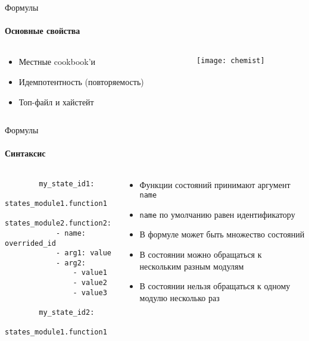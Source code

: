 \begin{Frame}{Формулы}

  \framesubtitle{Основные свойства}

  \begin{columns}
    \begin{column}{0.6\textwidth}
      \begin{itemize}[<+-| alert@ +>]
        \item[\faBook] Местные cookbook'и
        \baselinespace{}
        \item[\faRedo] Идемпотентность (повторяемость)
        \baselinespace{}
        \item[\faRocket] Топ-файл и хайстейт \ExampleIcon{}
      \end{itemize}
    \end{column}

    \begin{column}{0.4\textwidth}
      \texttt{[image: chemist]}
    \end{column}
  \end{columns}

\end{Frame}

\begin{frame}[fragile]{Формулы}
  \framesubtitle{Синтаксис}

  \begin{columns}
    \begin{column}{0.25\textwidth}
      \begin{verbatim}
        my_state_id1:
          states_module1.function1
          states_module2.function2:
            - name: overrided_id
            - arg1: value
            - arg2:
                - value1
                - value2
                - value3

        my_state_id2:
          states_module1.function1
      \end{verbatim}
    \end{column}
    \begin{column}{0.65\textwidth}
      \onslide<+->
      \begin{itemize}[<+-| alert@ +>]
        \footnotesize
        \item Функции состояний принимают аргумент \texttt{name}
        \baselinespace{}
        \item \texttt{name} по умолчанию равен идентификатору
        \baselinespace{}
        \item В формуле может быть множество состояний
        \baselinespace{}
        \item В состоянии можно обращаться к нескольким разным модулям
        \baselinespace{}
        \item В состоянии нельзя обращаться к одному модулю несколько раз
      \end{itemize}
    \end{column}
  \end{columns}
\end{frame}

